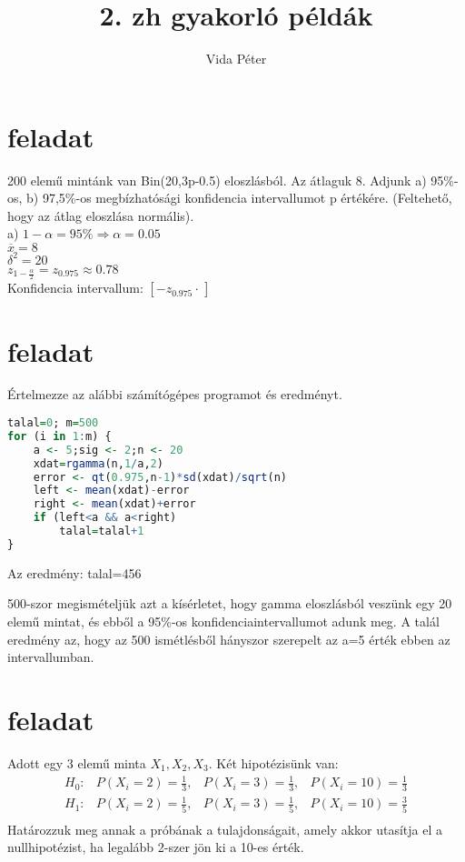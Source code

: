 \documentclass[]{article}
\title{2. zh gyakorl\'o p\'eld\'ak}
\author{Vida P\'eter}
\begin{document}
\maketitle

\begin{abstract}

\end{abstract}

\section{feladat}
200 elemű mintánk van Bin(20,3p-0.5) eloszlásból. Az átlaguk 8. Adjunk a) 95\%-os, b) 97,5\%-os megbízhatósági konfidencia intervallumot p értékére. (Feltehető, hogy az átlag eloszlása normális). \\
a) $1-\alpha = 95\% \Rightarrow\alpha = 0.05$ \\
$\overline{x} = 8$ \\
$\delta^2 = 20$ \\
$z_{1 - \frac{\alpha}{2}} = z_{0.975} \approx 0.78$\\
Konfidencia intervallum: 
\(
\left[  - z_{0.975} \cdot \frac{}{} \right]
\)




\section{feladat}
Értelmezze az alábbi számítógépes programot és eredményt.
\begin{lstlisting}[language=R]
talal=0; m=500
for (i in 1:m) {
	a <- 5;sig <- 2;n <- 20
	xdat=rgamma(n,1/a,2)
	error <- qt(0.975,n-1)*sd(xdat)/sqrt(n)
	left <- mean(xdat)-error
	right <- mean(xdat)+error
	if (left<a && a<right) 
		talal=talal+1
}
\end{lstlisting}
Az eredmény: talal=456

500-szor megism\'etelj\"uk azt a k\'is\'erletet, hogy gamma eloszl\'asb\'ol vesz\"unk egy 20 elem\H u mintat, \'es ebb\H ol a 95\%-os konfidenciaintervallumot adunk meg.
A tal\'al eredm\'eny az, hogy az 500 ism\'etl\'esb\H ol h\'anyszor szerepelt az a=5 \'ert\'ek ebben az intervallumban.
  
\section{feladat}
Adott egy 3 elemű minta $X_1, X_2, X_3$. 
Két hipotézisünk van:
\[ \begin{aligned}
H_0: & P(X_i=2)=\frac{1}{3}, & P(X_i=3)=\frac{1}{3},& P(X_i=10)=\frac{1}{3} \\
H_1: & P(X_i=2)=\frac{1}{5}, & P(X_i=3)=\frac{1}{5},& P(X_i=10)=\frac{3}{5} \\
\end{aligned} \]
Határozzuk meg annak a próbának a tulajdonságait, amely akkor utasítja el a nullhipotézist, ha legalább 2-szer jön ki a 10-es érték. 
\end{document}
